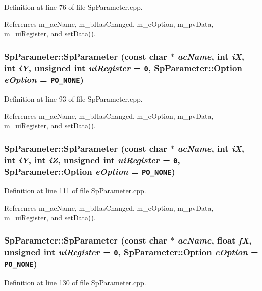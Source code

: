 Definition at line 76 of file Sp\-Parameter.cpp.

References m\_\-ac\-Name, m\_\-b\-Has\-Changed, m\_\-e\-Option, m\_\-pv\-Data, m\_\-ui\-Register, and set\-Data().
\subsubsection{\setlength{\rightskip}{0pt plus 5cm}Sp\-Parameter::Sp\-Parameter (const char $\ast$ {\em ac\-Name}, int {\em i\-X}, int {\em i\-Y}, unsigned int {\em ui\-Register} = {\tt 0}, {\bf Sp\-Parameter::Option} {\em e\-Option} = {\tt PO\_\-NONE})}\label{classSpark_1_1SpParameter_a5}


Definition at line 93 of file Sp\-Parameter.cpp.

References m\_\-ac\-Name, m\_\-b\-Has\-Changed, m\_\-e\-Option, m\_\-pv\-Data, m\_\-ui\-Register, and set\-Data().
\subsubsection{\setlength{\rightskip}{0pt plus 5cm}Sp\-Parameter::Sp\-Parameter (const char $\ast$ {\em ac\-Name}, int {\em i\-X}, int {\em i\-Y}, int {\em i\-Z}, unsigned int {\em ui\-Register} = {\tt 0}, {\bf Sp\-Parameter::Option} {\em e\-Option} = {\tt PO\_\-NONE})}\label{classSpark_1_1SpParameter_a6}


Definition at line 111 of file Sp\-Parameter.cpp.

References m\_\-ac\-Name, m\_\-b\-Has\-Changed, m\_\-e\-Option, m\_\-pv\-Data, m\_\-ui\-Register, and set\-Data().
\subsubsection{\setlength{\rightskip}{0pt plus 5cm}Sp\-Parameter::Sp\-Parameter (const char $\ast$ {\em ac\-Name}, float {\em f\-X}, unsigned int {\em ui\-Register} = {\tt 0}, {\bf Sp\-Parameter::Option} {\em e\-Option} = {\tt PO\_\-NONE})}\label{classSpark_1_1SpParameter_a7}


Definition at line 130 of file Sp\-Parameter.cpp.

